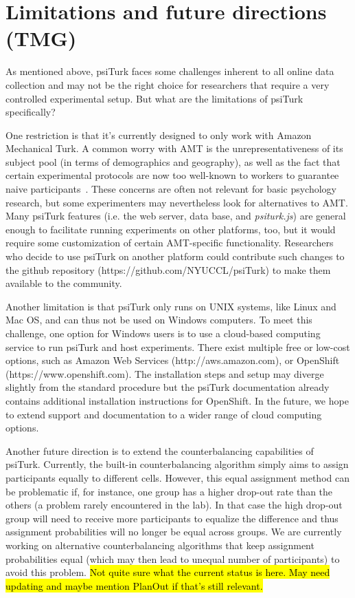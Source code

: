 \documentclass[twocolumn]{svjour3}          %
\newcommand{\psiturk}[0]{\textsf{psiTurk}}
\newcommand{\psiturkjs}[0]{\emph{psiturk.js}}
\begin{document}
\section{Limitations and future directions (TMG)}

As mentioned above, \psiturk{} faces some challenges inherent to all online data collection and may not be the right choice for
researchers that require a very controlled experimental setup. But what are the limitations of \psiturk{} specifically?

One restriction is that it's currently designed to only work with Amazon Mechanical Turk. A common worry with AMT is the unrepresentativeness of
its subject pool (in terms of demographics and geography), as well as the fact that certain experimental protocols are now too well-known 
to workers to guarantee naive
participants~\citep{chandler2014nonnaivete}. These concerns are often not relevant for basic psychology research, but some experimenters may nevertheless
look for alternatives to AMT. Many \psiturk{} features (i.e. the web server, data base, and \psiturkjs{}) are general
enough to facilitate running experiments on other platforms, too, but it would require some customization of certain AMT-specific functionality. 
Researchers who decide
to use \psiturk{} on another platform could contribute such changes to the github repository (https://github.com/NYUCCL/psiTurk) to make them
available to the community.


Another limitation is that \psiturk{} only runs on UNIX systems, like Linux and Mac OS, and can thus not be used on Windows computers. To meet this 
challenge, one option for Windows users is to use a cloud-based computing service to run \psiturk{} and host experiments. There exist
multiple free or low-cost options, such as Amazon Web Services (http://aws.amazon.com), or OpenShift (https://www.openshift.com). 
The installation steps and setup may diverge slightly from the standard procedure but 
 the \psiturk{} documentation already contains additional installation instructions for OpenShift. In the future, we hope to extend support  and 
documentation to a wider range of cloud computing options.

Another future direction is to extend the counterbalancing capabilities of \psiturk{}. Currently, the built-in counterbalancing algorithm
simply aims to assign participants equally to different cells.  However, this equal assignment method can be problematic if, for instance, 
one group has a higher drop-out rate than the others (a problem rarely encountered in the lab). 
In that case the high drop-out group will need to receive
more participants to equalize the difference and thus assignment probabilities will no longer be equal across groups. We are
currently working on alternative counterbalancing algorithms that keep assignment probabilities equal (which may then lead to unequal
number of participants) to avoid this problem. \hl{Not quite sure what the current status is here. May need updating and maybe mention PlanOut
if that's still relevant.}
\end{document}
